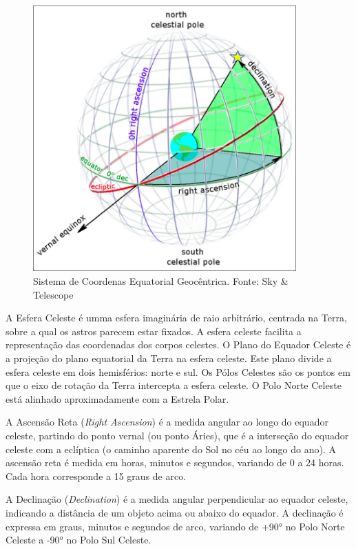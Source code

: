 \documentclass[a4,12pt]{horizon-theme}
\begin{document}
\begin{figure}[!ht]
  \centering
  \includegraphics[width=0.9\textwidth]{figures/equatorial_system.png}
  \caption{Sistema de Coordenas Equatorial Geocêntrica. Fonte: Sky \& Telescope}
  \label{fig:coord-equatorial}
\end{figure}

A Esfera Celeste é umma esfera imaginária de raio arbitrário, centrada na Terra, sobre a qual os astros parecem estar fixados. A esfera celeste facilita a representação das coordenadas dos corpos celestes. O Plano do Equador Celeste é a projeção do plano equatorial da Terra na esfera celeste. Este plano divide a esfera celeste em dois hemisférios: norte e sul. Os Pólos Celestes são os pontos em que o eixo de rotação da Terra intercepta a esfera celeste. O Polo Norte Celeste está alinhado aproximadamente com a Estrela Polar.

A Ascensão Reta (\emph{Right Ascension}) é a medida angular ao longo do equador celeste, partindo do ponto vernal (ou ponto Áries), que é a interseção do equador celeste com a eclíptica (o caminho aparente do Sol no céu ao longo do ano). A ascensão reta é medida em horas, minutos e segundos, variando de 0 a 24 horas. Cada hora corresponde a 15 graus de arco.

A Declinação (\emph{Declination}) é a medida angular perpendicular ao equador celeste, indicando a distância de um objeto acima ou abaixo do equador. A declinação é expressa em graus, minutos e segundos de arco, variando de +90° no Polo Norte Celeste a -90° no Polo Sul Celeste.
\end{document}

